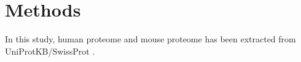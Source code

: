 \section{Methods}
In this study, human proteome and mouse proteome has been extracted from UniProtKB/SwissProt \cite{2007}. 

